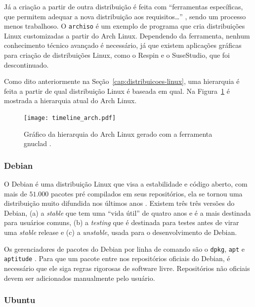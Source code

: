 \documentclass[
article,			%
12pt,				%
openright,			%
oneside,			%
a4paper,			%
chapter=TITLE,		%
section=TITLE,		%
subsection=TITLE,	%
subsubsection=TITLE,%
subsubsubsection=TITLE, %
english,			%
brazil,				%
]{abntex2}
\def\code#1{\texttt{#1}}
\begin{document}
Já a criação a partir de outra distribuição é feita com ``ferramentas
específicas, que  permitem adequar  a  nova  distribuição  aos
requisitos\ldots'' \cite[p. 78]{Nunes2009}, sendo um processo menos
trabalhoso. O \code{archiso} é um exemplo de programa que cria
distribuições Linux customizadas a partir do Arch Linux. Dependendo da
ferramenta, nenhum conhecimento técnico avançado é necessário, já que
existem aplicações gráficas para criação de distribuições Linux, como
o Respin \cite{Respin2018} e o SuseStudio, que foi descontinuado.

Como dito anteriormente na Seção~\ref{cap:distribuicoes-linux}, uma
hierarquia é feita a partir de qual distribuição Linux é baseada em
qual. Na Figura~\ref{fig:hierarquia-arch} é mostrada a hierarquia
atual do Arch Linux.

\begin{figure}[H]
    \caption{\label{fig:hierarquia-arch}Gráfico da hierarquia do Arch
    Linux gerado com a ferramenta gnuclad \cite{Loli2017}.}
    \begin{center}
        \texttt{[image: timeline\_arch.pdf]}
    \end{center}
\end{figure}

\subsubsection{Debian}

O Debian é uma distribuição Linux que visa a estabilidade e código
aberto, com mais de $51.000$ pacotes pré compilados em seus
repositórios, ela se tornou uma distribuição muito difundida nos
últimos anos \cite{Debian2018}. Existem três três versões do Debian,
(a) a \emph{stable} que tem uma ``vida útil'' de quatro anos e é a
mais destinada para usuários comuns, (b) a \emph{testing} que é
destinada para testes antes de virar uma \emph{stable} release e (c) a
\emph{unstable}, usada para o desenvolvimento de Debian.

Os gerenciadores de pacotes do Debian por linha de comando são o
\code{dpkg}, \code{apt} e \code{aptitude} \cite{Debian2016}. Para que
um pacote entre nos repositórios oficiais do Debian, é necessário que
ele siga regras rigorosas de software livre. Repositórios não oficiais
devem ser adicionados manualmente pelo usuário.

\subsubsection{Ubuntu}
\end{document}
